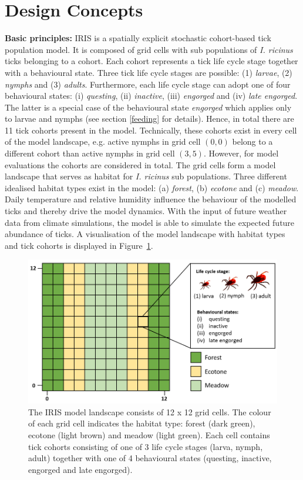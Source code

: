 \documentclass[a4paper, 11pt]{scrartcl}
\begin{document}
\newpage
\section{Design Concepts}\label{design_concepts}
\textbf{Basic principles:} IRIS is a spatially explicit stochastic cohort-based tick population model. It is composed of grid cells with sub populations of \textit{I. ricinus} ticks belonging to a cohort. Each cohort represents a tick life cycle stage together with a behavioural state. Three tick life cycle stages are possible: (1) \emph{larvae}, (2) \emph{nymphs} and (3) \emph{adults}. Furthermore, each life cycle stage can adopt one of four behavioural states: (i) \emph{questing}, (ii) \emph{inactive}, (iii)  \emph{engorged} and (iv) \emph{late engorged}. The latter is a special case of the behavioural state \emph{engorged} which applies only to larvae and nymphs (see section \ref{feeding} for details). Hence, in total there are 11 tick cohorts present in the model. Technically, these cohorts exist in every cell of the model landscape, e.g. active nymphs in grid cell $(0,0)$ belong to a different cohort than active nymphs in grid cell $(3,5)$. However, for model evaluations the cohorts are considered in total. The grid cells form a model landscape that serves as habitat for \emph{I. ricinus} sub populations. Three different idealised habitat types exist in the model: (a) \emph{forest}, (b) \emph{ecotone} and (c) \emph{meadow}. Daily temperature and relative humidity influence the behaviour of the modelled ticks and thereby drive the model dynamics. With the input of future weather data from climate simulations, the model is able to simulate the expected future abundance of ticks. A visualisation of the model landscape with habitat types and tick cohorts is displayed in Figure~\ref{fig:iris_landscape}.

\begin{figure}[h!]
\centering
\includegraphics[width=0.75\linewidth]{landscape}
\caption{The IRIS model landscape consists of 12 x 12 grid cells. The colour of each grid cell indicates the habitat type: forest (dark green), ecotone (light brown) and meadow (light green). Each cell contains tick cohorts consisting of one of 3 life cycle stages (larva, nymph, adult) together with one of 4 behavioural states (questing, inactive, engorged and late engorged).}
\label{fig:iris_landscape}
\end{figure}
\end{document}
